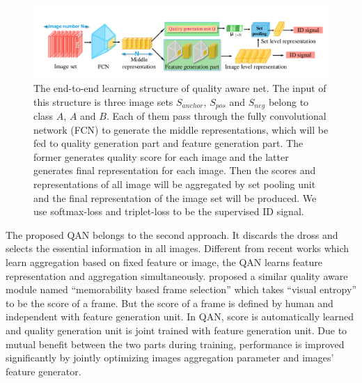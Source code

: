 \label{sec:qualitynet}
\begin{figure}[!htbp]
  \centering
  \includegraphics[width=17cm]{figure_train.pdf}
  \caption{The end-to-end learning structure of quality aware net. The input of this structure is three image sets $S_{anchor}$, $S_{pos}$ and $S_{neg}$ belong to class $A$, $A$ and $B$. Each of them pass through the fully convolutional network (FCN) to generate the middle representations, which will be fed to quality generation part and feature generation part. The former generates quality score for each image and the latter generates final representation for each image. Then the scores and representations of all image will be aggregated by set pooling unit and the final representation of the image set will be produced. We use softmax-loss and triplet-loss to be the supervised ID signal. }
\label{figure_train}
\end{figure}


The proposed QAN belongs to the second approach. It 
discards the dross and selects the essential information in all images. Different from recent works which learn aggregation based on fixed feature \cite{yang2016neural} or image\cite{hassner2016pooling}, the QAN learns feature representation and aggregation simultaneously.  \cite{goswami2014mdlface} proposed a similar quality aware module named ``memorability based frame selection'' which  takes ``visual entropy'' to be the score of a frame. But the score of a frame is defined by human and independent with feature generation unit. In QAN,  score is automatically learned and quality generation unit is joint trained with feature generation unit. Due to mutual benefit between the two parts during training, performance is improved significantly by jointly optimizing images aggregation parameter and images' feature generator.


